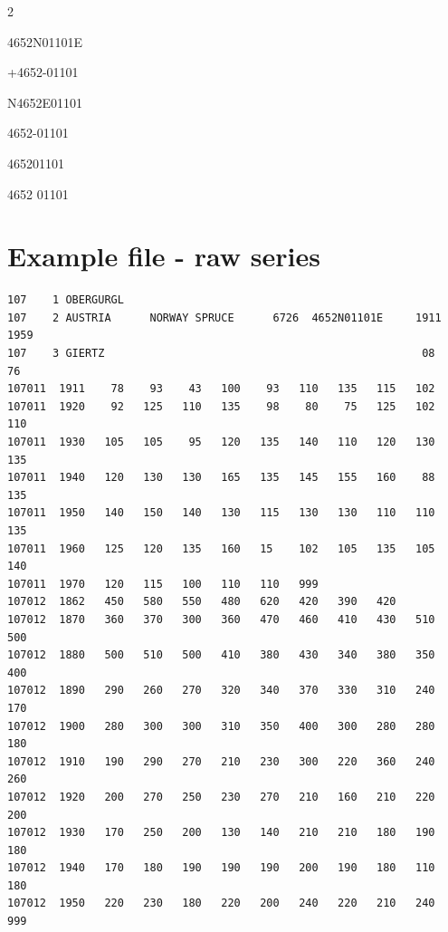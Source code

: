 \begin{itemize*}
\begin{multicols}{2}
\begin{itemize*}
\item  4652N01101E
\item  +4652-01101
\item  N4652E01101
\item  4652-01101
\item  465201101
\item  4652 01101 
\end{itemize*}
\end{multicols}

\end{itemize*}

\newpage
\section{Example file - raw series}
\begin{lstlisting}
107    1 OBERGURGL
107    2 AUSTRIA      NORWAY SPRUCE      6726  4652N01101E     1911 1959
107    3 GIERTZ                                                 08    76
107011  1911    78    93    43   100    93   110   135   115   102
107011  1920    92   125   110   135    98    80    75   125   102   110
107011  1930   105   105    95   120   135   140   110   120   130   135
107011  1940   120   130   130   165   135   145   155   160    88   135
107011  1950   140   150   140   130   115   130   130   110   110   135
107011  1960   125   120   135   160   15    102   105   135   105   140
107011  1970   120   115   100   110   110   999
107012  1862   450   580   550   480   620   420   390   420
107012  1870   360   370   300   360   470   460   410   430   510   500
107012  1880   500   510   500   410   380   430   340   380   350   400
107012  1890   290   260   270   320   340   370   330   310   240   170
107012  1900   280   300   300   310   350   400   300   280   280   180
107012  1910   190   290   270   210   230   300   220   360   240   260
107012  1920   200   270   250   230   270   210   160   210   220   200
107012  1930   170   250   200   130   140   210   210   180   190   180
107012  1940   170   180   190   190   190   200   190   180   110   180
107012  1950   220   230   180   220   200   240   220   210   240   999
\end{lstlisting}

\newpage
